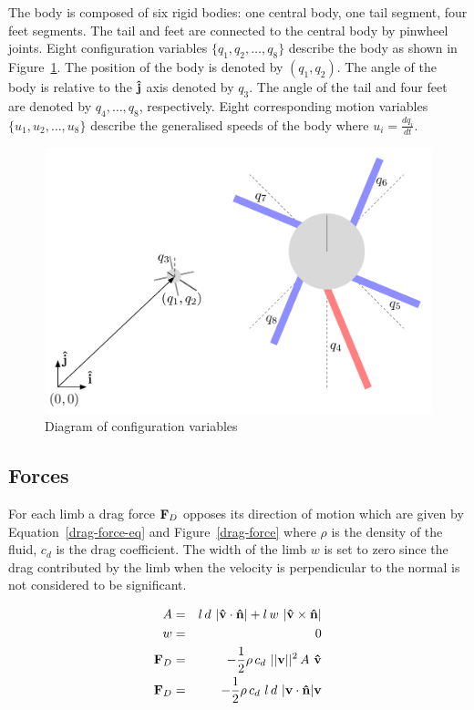 The body is composed of six rigid bodies: one central body, one tail
segment, four feet segments.  The tail and feet are connected to the
central body by pinwheel joints.  Eight configuration variables
$\{q_1, q_2, \ldots, q_8\}$ describe the body as shown in
Figure~\ref{confvars}.  The position of the body is denoted by $(q_1,
q_2)$.  The angle of the body is relative to the $\bf \hat j$ axis
denoted by $q_3$.  The angle of the tail and four feet are denoted by
$q_4, \ldots, q_8$, respectively.  Eight corresponding motion
variables $\{u_1, u_2, \ldots, u_8\}$ describe the generalised speeds
of the body where $u_i = \frac{d q_i}{d t}$.

\begin{figure}
  \begin{center} 
    \includegraphics[scale=0.6]{fig/confvars.pdf} 
  \end{center} 
  \caption{Diagram of configuration variables}
  \label{confvars}
\end{figure}

\subsection{Forces}

For each limb a drag force $\mathbf{F}_D$ opposes its direction of motion
which are given by Equation~\ref{drag-force-eq} and
Figure~\ref{drag-force} where $\rho$ is the density of the fluid,
$c_d$ is the drag coefficient.  The width of the limb $w$ is set to
zero since the drag contributed by the limb when the velocity is
perpendicular to the normal is not considered to be significant.

\begin{eqnarray}
  A &=& l\,d~ |\mathbf{\hat{v}} \cdot \mathbf{\hat{n}}| + l\, w~|\mathbf{\hat{v}} \times \mathbf{\hat{n}}|\\
  w &=& 0 \\
  \mathbf{F}_D &=& -\frac{1}{2} \rho\,c_d~||\mathbf{v}||^2\,A~\mathbf{\hat{v}} \\
  \mathbf{F}_D &=& -\frac{1}{2} \rho\, c_d~ l\,d~|\mathbf{v} \cdot \mathbf{\hat{n}}|\mathbf{v} \label{drag-force-eq} 
\end{eqnarray}


